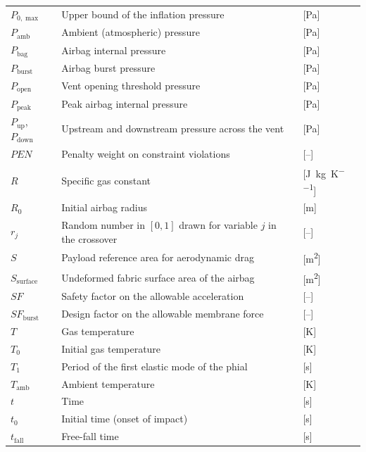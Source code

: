 {\begin{longtable}{L{0.16} L{0.64} L{0.20}}
$P_{0,\max}$ & Upper bound of the inflation pressure & [\si{\pascal}] \\
$P_\text{amb}$ & Ambient (atmospheric) pressure & [\si{\pascal}] \\
$P_\text{bag}$ & Airbag internal pressure & [\si{\pascal}] \\
$P_\text{burst}$ & Airbag burst pressure & [\si{\pascal}] \\
$P_\text{open}$ & Vent opening threshold pressure & [\si{\pascal}] \\
$P_\text{peak}$ & Peak airbag internal pressure & [\si{\pascal}] \\
$P_\text{up}$, $P_\text{down}$ & Upstream and downstream pressure across the vent & [\si{\pascal}] \\
$\mathit{PEN}$ & Penalty weight on constraint violations & [--] \\
$R$ & Specific gas constant & [\si{\joule\per\kilogram\per\kelvin}] \\
$R_0$ & Initial airbag radius & [\si{\metre}] \\
$r_j$ & Random number in $[0, 1]$ drawn for variable $j$ in the crossover & [--] \\
$S$ & Payload reference area for aerodynamic drag & [\si{\metre\squared}] \\
$S_\text{surface}$ & Undeformed fabric surface area of the airbag & [\si{\metre\squared}] \\
$\mathit{SF}$ & Safety factor on the allowable acceleration & [--] \\
$\mathit{SF}_\text{burst}$ & Design factor on the allowable membrane force & [--] \\
$T$ & Gas temperature & [\si{\kelvin}] \\
$T_0$ & Initial gas temperature & [\si{\kelvin}] \\
$T_1$ & Period of the first elastic mode of the phial & [\si{\second}] \\
$T_\text{amb}$ & Ambient temperature & [\si{\kelvin}] \\
$t$ & Time & [\si{\second}] \\
$t_0$ & Initial time (onset of impact) & [\si{\second}] \\
$t_\text{fall}$ & Free-fall time & [\si{\second}] \\

\end{longtable}}
